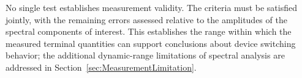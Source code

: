 No single test establishes measurement validity.
The criteria must be satisfied jointly, with the remaining errors assessed relative to the amplitudes of the spectral components of interest.
This establishes the range within which the measured terminal quantities can support conclusions about device switching behavior; the additional dynamic-range limitations of spectral analysis are addressed in Section~\ref{sec:MeasurementLimitation}.